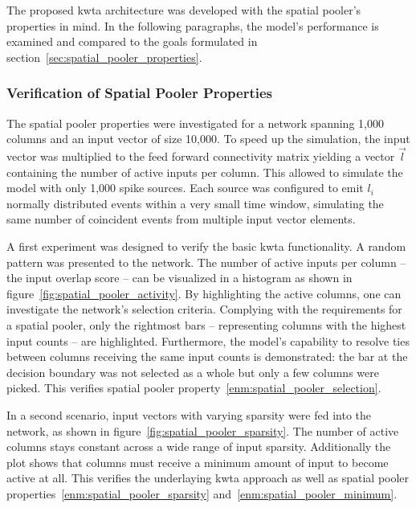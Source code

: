 The proposed \gls{kwta} architecture was developed with the spatial pooler's properties in mind. In the following paragraphs, the model's performance is examined and compared to the goals formulated in section~\ref{sec:spatial_pooler_properties}.

\subsubsection{Verification of Spatial Pooler Properties}

The spatial pooler properties were investigated for a network spanning 1,000 columns and an input vector of size 10,000. To speed up the simulation, the input vector was multiplied to the feed forward connectivity matrix yielding a vector $\vec{l}$ containing the number of active inputs per column. This allowed to simulate the model with only 1,000 spike sources. Each source was configured to emit $l_i$ normally distributed events within a very small time window, simulating the same number of coincident events from multiple input vector elements.

A first experiment was designed to verify the basic \gls{kwta} functionality. A random pattern was presented to the network. The number of active inputs per column -- the input overlap score -- can be visualized in a histogram as shown in figure~\ref{fig:spatial_pooler_activity}. By highlighting the active columns, one can investigate the network's selection criteria. Complying with the requirements for a spatial pooler, only the rightmost bars -- representing columns with the highest input counts -- are highlighted. Furthermore, the model's capability to resolve ties between columns receiving the same input counts is demonstrated: the bar at the decision boundary was not selected as a whole but only a few columns were picked. This verifies spatial pooler property~\ref{enm:spatial_pooler_selection}.

In a second scenario, input vectors with varying sparsity were fed into the network, as shown in figure~\ref{fig:spatial_pooler_sparsity}. The number of active columns stays constant across a wide range of input sparsity. Additionally the plot shows that columns must receive a minimum amount of input to become active at all. This verifies the underlaying \gls{kwta} approach as well as spatial pooler properties~\ref{enm:spatial_pooler_sparsity} and~\ref{enm:spatial_pooler_minimum}.

